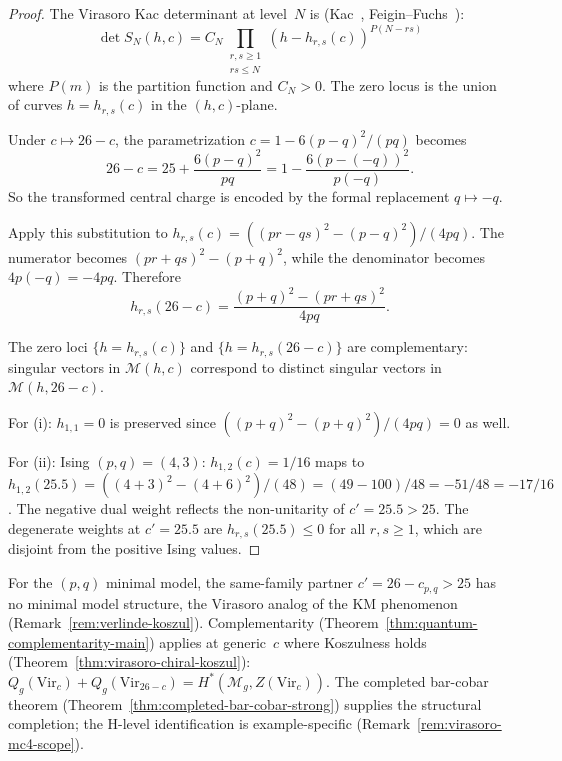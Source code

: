\begin{proof}
The Virasoro Kac determinant at level~$N$ is
(Kac~\cite{Kac}, Feigin--Fuchs~\cite{FF84}):
\[
\det S_N(h, c) = C_N \prod_{\substack{r, s \geq 1 \\ rs \leq N}}
(h - h_{r,s}(c))^{P(N - rs)}
\]
where $P(m)$ is the partition function and $C_N > 0$. The zero locus
is the union of curves $h = h_{r,s}(c)$ in the $(h, c)$-plane.

Under $c \mapsto 26 - c$, the parametrization
$c = 1 - 6(p-q)^2/(pq)$ becomes
\[
26 - c = 25 + \frac{6(p-q)^2}{pq}
= 1 - \frac{6(p-(-q))^2}{p(-q)}.
\]
So the transformed central charge is encoded by the formal
replacement $q \mapsto -q$.

Apply this substitution to
$h_{r,s}(c) = ((pr-qs)^2 - (p-q)^2)/(4pq)$.
The numerator becomes $(pr+qs)^2 - (p+q)^2$, while the denominator
becomes $4p(-q) = -4pq$. Therefore
\[
h_{r,s}(26-c) = \frac{(p+q)^2 - (pr+qs)^2}{4pq}.
\]

The zero loci $\{h = h_{r,s}(c)\}$ and $\{h = h_{r,s}(26-c)\}$ are
complementary: singular vectors in $\mathcal{M}(h, c)$ correspond to
distinct singular vectors in $\mathcal{M}(h, 26-c)$.

For (i): $h_{1,1} = 0$ is preserved
since $((p+q)^2 - (p+q)^2)/(4pq) = 0$ as well.

For (ii): Ising $(p,q) = (4,3)$: $h_{1,2}(c) = 1/16$ maps to
$h_{1,2}(25.5) = ((4+3)^2 - (4+6)^2)/(48) = (49 - 100)/48 = -51/48
= -17/16$. The negative dual weight reflects the non-unitarity of
$c' = 25.5 > 25$. The degenerate
weights at $c' = 25.5$ are $h_{r,s}(25.5) \leq 0$ for all $r, s \geq 1$,
which are disjoint from the positive Ising values.
\end{proof}

\begin{remark}
\label{rem:virasoro-module-koszul-minimal}
For the $(p,q)$ minimal model, the same-family partner
$c' = 26 - c_{p,q} > 25$ has no minimal model structure, the Virasoro
analog of the KM phenomenon (Remark~\ref{rem:verlinde-koszul}).
Complementarity (Theorem~\ref{thm:quantum-complementarity-main})
applies at generic~$c$ where Koszulness holds
(Theorem~\ref{thm:virasoro-chiral-koszul}):
$Q_g(\mathrm{Vir}_c) + Q_g(\mathrm{Vir}_{26-c})
= H^*(\mathcal{M}_g, Z(\mathrm{Vir}_c))$. The completed bar-cobar
theorem (Theorem~\ref{thm:completed-bar-cobar-strong}) supplies the
structural completion; the H-level identification is example-specific
(Remark~\ref{rem:virasoro-mc4-scope}).
\end{remark}


